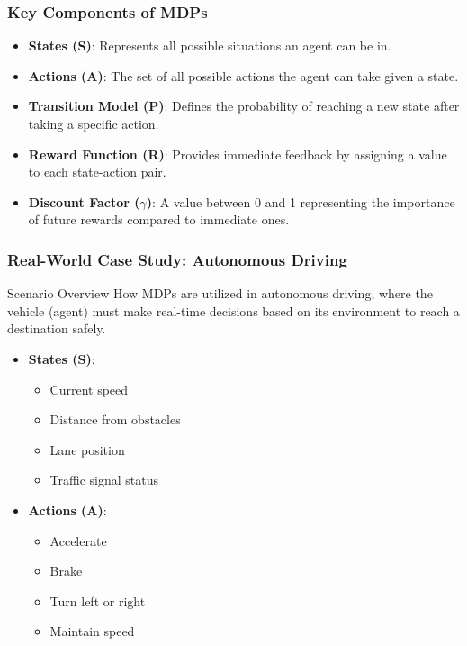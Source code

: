 \documentclass[aspectratio=169]{beamer}
\begin{document}
\begin{frame}[fragile]
    \frametitle{Key Components of MDPs}
    \begin{itemize}
        \item \textbf{States (S)}: Represents all possible situations an agent can be in.
        \item \textbf{Actions (A)}: The set of all possible actions the agent can take given a state.
        \item \textbf{Transition Model (P)}: Defines the probability of reaching a new state after taking a specific action.
        \item \textbf{Reward Function (R)}: Provides immediate feedback by assigning a value to each state-action pair.
        \item \textbf{Discount Factor ($\gamma$)}: A value between 0 and 1 representing the importance of future rewards compared to immediate ones.
    \end{itemize}
\end{frame}

\begin{frame}[fragile]
    \frametitle{Real-World Case Study: Autonomous Driving}
    \begin{block}{Scenario Overview}
        How MDPs are utilized in autonomous driving, where the vehicle (agent) must make real-time decisions based on its environment to reach a destination safely.
    \end{block}
    
    \begin{itemize}
        \item \textbf{States (S)}: 
        \begin{itemize}
            \item Current speed
            \item Distance from obstacles
            \item Lane position
            \item Traffic signal status
        \end{itemize}
        \item \textbf{Actions (A)}: 
        \begin{itemize}
            \item Accelerate
            \item Brake
            \item Turn left or right
            \item Maintain speed
        \end{itemize}
    \end{itemize}
\end{frame}
\end{document}
